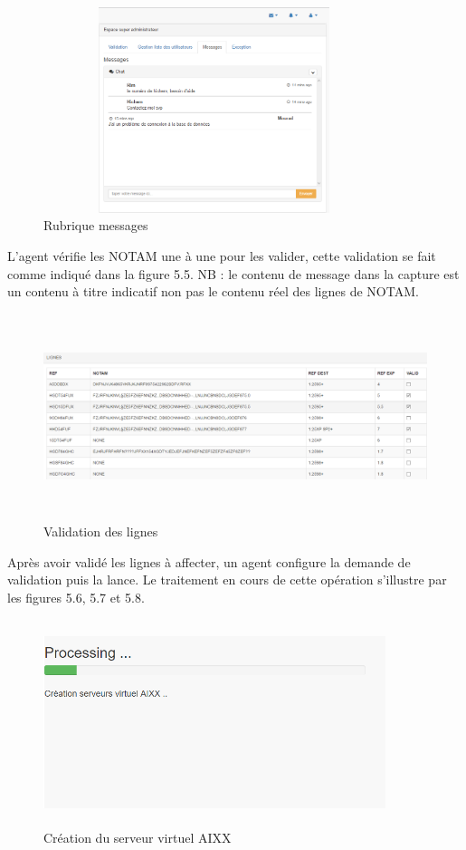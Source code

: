 \begin{figure}[!h]
\begin{center}
\includegraphics[width=10cm,height=6cm]{resultats/message.png}
\end{center}
\caption{Rubrique messages}
\end{figure}
\newpage
L’agent vérifie les NOTAM une à une pour les valider, cette validation se fait comme indiqué dans la figure 5.5. NB : le contenu de message dans la capture est un contenu à titre indicatif non pas le contenu réel des lignes de NOTAM.\\
\begin{figure}[!h]
\begin{center}
\includegraphics[width=15cm,height=6cm]{resultats/NOTAM.png}
\end{center}
\caption{Validation des lignes}
\end{figure}
\newpage
Après avoir validé les lignes à affecter, un agent configure la demande de validation puis la lance. Le traitement en cours de cette opération s’illustre par les figures 5.6, 5.7 et 5.8. \\
\begin{figure}[!h]
\begin{center}
\includegraphics[width=10cm,height=6cm]{resultats/processing1.png}
\end{center}
\caption{Création du serveur virtuel AIXX}
\end{figure}

